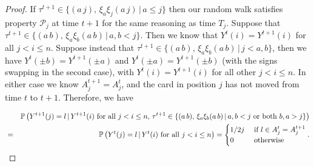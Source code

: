 \documentclass[11pt]{report}
\begin{document}
\begin{proof}
	
	If $\tau^{t+1} \in \{(a\,j), \, \xi_{a}\xi_{j} (a \,j) \, | \, a\leq j \}$ then our random walk satisfies property $\mathcal{P}_{j}$ at time $t+1$ for the same reasoning as time $T_{j}$. 
	Suppose that $\tau^{t+1} \in \{(a\,b), \, \xi_{a}\xi_{b} (a \,b ) \, | \,  a,b< j \}$. Then we know that $Y^{t}(i) = Y^{t+1}(i)$ for all $j<i \leq n$. Suppose instead that $\tau^{t+1} \in \{(a\,b), \, \xi_{a}\xi_{b} (a \,b ) \, | \,  j <a,b\}$, then we have $ Y^{t}(\pm b) = Y^{t+1}( \pm a)$ and $ Y^{t}( \pm a) = Y^{t+1}(\pm b)$ (with the signs swapping in the second case), with $Y^{t}(i) = Y^{t+1}(i)$ for all other $j<i\leq n$. In either case we know $A_{j}^{t+1} = A_{j}^{t}$, and the card in position $j$ has not moved from time $t$ to $t+1$. Therefore, we have

	\begin{eqnarray}
	& & \mathbb{P}\left(Y^{t+1} (j) = l \, | \, Y^{t+1}(i) \textnormal{ for all } j < i \leq n, \, \tau^{t+1}  \in \{(a\,b), \, \xi_{a}\xi_{b} (a \,b ) \, | \,  a,b< j \textnormal{ or both } b,a>j\} \right) \nonumber \\	
	& = & \mathbb{P}\left(Y^{t} (j) = l \, | \, Y^{t}(i) \textnormal{ for all } j < i \leq n \right)  = 
	\begin{cases}
	1/2j & \textnormal{ if } l \in A_{j}^{t} = A_{j}^{t+1}\\
	0 & \textnormal{ otherwise } 
	\end{cases} \nonumber.
	\end{eqnarray}
	

\end{proof}
\end{document}
